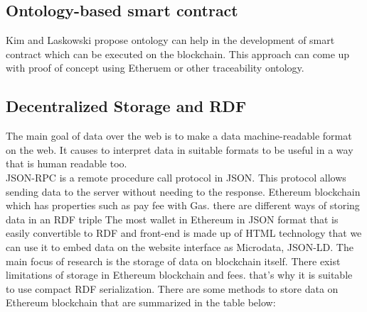 \subsection{Ontology-based smart contract}
Kim and Laskowski\cite{Kim} propose ontology can help in the development of smart contract which can be executed on the blockchain. This approach can come up with proof of concept using Etheruem or other traceability ontology\cite{Hector}.

\subsection{Decentralized Storage and RDF}
The main goal of data over the web is to make a data machine-readable format on the web. It causes to interpret data in suitable formats to be useful in a way that is human readable too. \\
JSON-RPC is a remote procedure call protocol in JSON. This protocol allows sending data to the server without needing to the response. 
Ethereum blockchain which has properties such as pay fee with Gas. there are different ways of storing data in an RDF triple
The most wallet in Ethereum in JSON format that is easily convertible to RDF and front-end is made up of HTML  technology that we can use it to embed data on the website interface as Microdata, JSON-LD. The main focus of research is the storage of data on blockchain itself. There exist limitations of storage in Ethereum blockchain and fees. that's why it is suitable to use compact RDF serialization. There are some methods to store data on Ethereum blockchain that are summarized in the table below\cite{
	Hector}:\\

